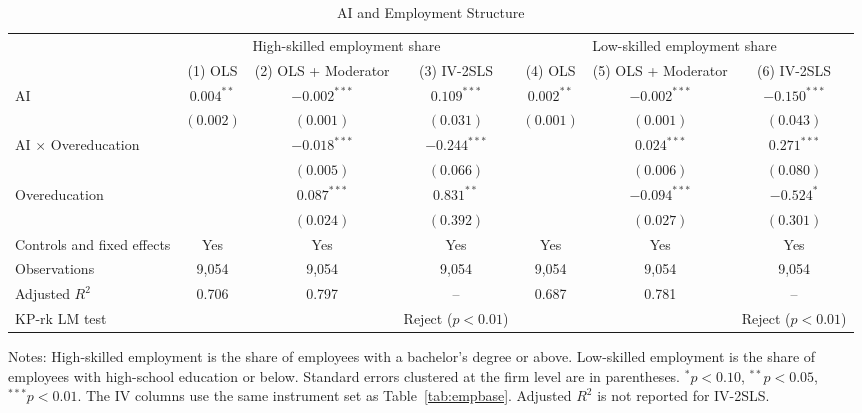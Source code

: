 \documentclass[12pt,a4paper]{article}
\theoremstyle{predstyle}
\theoremstyle{plain}
\begin{document}
\begin{landscape}
\begin{table}[H]
\centering
\caption{AI and Employment Structure}
\label{tab:skillstructure}
\begin{threeparttable}
\small
\begin{tabular}{lcccccc}
\toprule
 & \multicolumn{3}{c}{High-skilled employment share} & \multicolumn{3}{c}{Low-skilled employment share} \\
\cmidrule(lr){2-4}\cmidrule(lr){5-7}
 & (1) OLS & (2) OLS + Moderator & (3) IV-2SLS & (4) OLS & (5) OLS + Moderator & (6) IV-2SLS \\
\midrule
AI & \(0.004^{**}\) & \(-0.002^{***}\) & \(0.109^{***}\) & \(0.002^{**}\) & \(-0.002^{***}\) & \(-0.150^{***}\) \\
 & \((0.002)\) & \((0.001)\) & \((0.031)\) & \((0.001)\) & \((0.001)\) & \((0.043)\) \\
AI \(\times\) Overeducation & & \(-0.018^{***}\) & \(-0.244^{***}\) & & \(0.024^{***}\) & \(0.271^{***}\) \\
 & & \((0.005)\) & \((0.066)\) & & \((0.006)\) & \((0.080)\) \\
Overeducation & & \(0.087^{***}\) & \(0.831^{**}\) & & \(-0.094^{***}\) & \(-0.524^{*}\) \\
 & & \((0.024)\) & \((0.392)\) & & \((0.027)\) & \((0.301)\) \\
Controls and fixed effects & Yes & Yes & Yes & Yes & Yes & Yes \\
\midrule
Observations & 9,054 & 9,054 & 9,054 & 9,054 & 9,054 & 9,054 \\
Adjusted \(R^2\) & 0.706 & 0.797 & -- & 0.687 & 0.781 & -- \\
KP-rk LM test & & & Reject (\(p<0.01\)) & & & Reject (\(p<0.01\)) \\
\bottomrule
\end{tabular}
\begin{tablenotes}
\footnotesize
\item Notes: High-skilled employment is the share of employees with a bachelor's degree or above. Low-skilled employment is the share of employees with high-school education or below. Standard errors clustered at the firm level are in parentheses. \(^{*}p<0.10\), \(^{**}p<0.05\), \(^{***}p<0.01\). The IV columns use the same instrument set as Table~\ref{tab:empbase}. Adjusted \(R^2\) is not reported for IV-2SLS.
\end{tablenotes}
\end{threeparttable}
\end{table}
\end{landscape}
\end{document}
